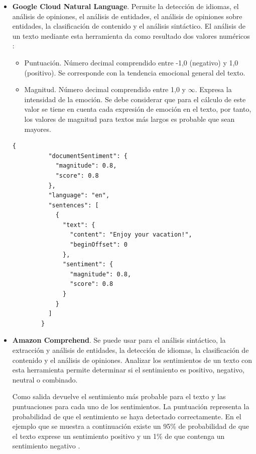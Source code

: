 \begin{itemize}
    \item \textbf{Google Cloud Natural Language}. Permite la detección de idiomas, el análisis de opiniones, el análisis de entidades, el análisis de opiniones sobre entidades, la clasificación de contenido y el análisis sintáctico. El análisis de un texto mediante esta herramienta da como resultado dos valores numéricos :
    \begin{itemize}
        \item Puntuación. Número decimal comprendido entre -1,0 (negativo) y 1,0 (positivo). Se corresponde con la tendencia emocional general del texto.
        \item  Magnitud. Número decimal comprendido entre 1,0 y $\infty$. Expresa la intensidad de la emoción. Se debe considerar que para el cálculo de este valor se tiene en cuenta cada expresión de emoción en el texto, por tanto, los valores de magnitud para textos más largos es probable que sean mayores.
    \end{itemize}
    \begin{lstlisting}[caption= Salida al analizar el sentimiento de un texto con Natural Language]
        {
          "documentSentiment": {
            "magnitude": 0.8,
            "score": 0.8
          },
          "language": "en",
          "sentences": [
            {
              "text": {
                "content": "Enjoy your vacation!",
                "beginOffset": 0
              },
              "sentiment": {
                "magnitude": 0.8,
                "score": 0.8
              }
            }
          ]
        }

    \end{lstlisting}
    \item \textbf{Amazon Comprehend}. Se puede usar para el análisis sintáctico, la extracción y análisis de entidades, la detección de idiomas, la clasificación de contenido y el análisis de opiniones. Analizar los sentimientos de un texto con esta herramienta permite determinar si el sentimiento es positivo, negativo, neutral o combinado. 
    
    Como salida devuelve el sentimiento más probable para el texto y las puntuaciones para cada uno de los sentimientos. La puntuación representa la probabilidad de que el sentimiento se haya detectado correctamente. En el ejemplo que se muestra a continuación existe un 95\% de probabilidad de que el texto exprese un sentimiento positivo y un 1\% de que contenga un sentimiento negativo .
    

\end{itemize}
